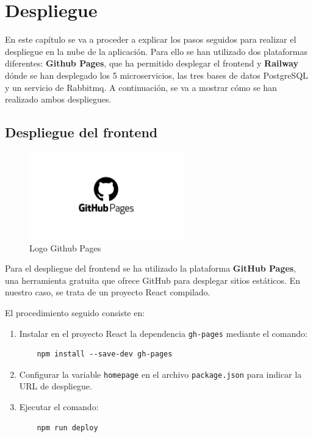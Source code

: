 \chapter{Despliegue} \label{despliegue}

En este capítulo se va a proceder a explicar los pasos seguidos para realizar el despliegue en la nube de la aplicación. Para ello se han utilizado dos plataformas diferentes: \textbf{Github Pages}, que ha permitido desplegar el frontend y \textbf{Railway} \cite{Railway} dónde se han desplegado los 5 microservicios, las tres bases de datos PostgreSQL y un servicio de Rabbitmq. A continuación, se va a mostrar cómo se han realizado ambos despliegues.

\section{Despliegue del frontend}
\begin{figure}[H]
  \centering
  \includegraphics[width=0.6\textwidth]{fotos/pages.jpg}
  \caption{Logo Github Pages}
  \label{fig:pages}
\end{figure}
Para el despliegue del frontend se ha utilizado la plataforma \textbf{GitHub Pages}, una herramienta gratuita que ofrece GitHub para desplegar sitios estáticos. En nuestro caso, se trata de un proyecto React compilado. 

El procedimiento seguido consiste en:

\begin{enumerate}
    \item Instalar en el proyecto React la dependencia \texttt{gh-pages} mediante el comando:
    \begin{verbatim}
    npm install --save-dev gh-pages
    \end{verbatim}
    
    \item Configurar la variable \texttt{homepage} en el archivo \texttt{package.json} para indicar la URL de despliegue.
    
    \item Ejecutar el comando:
    \begin{verbatim}
    npm run deploy
    \end{verbatim}
\end{enumerate}


